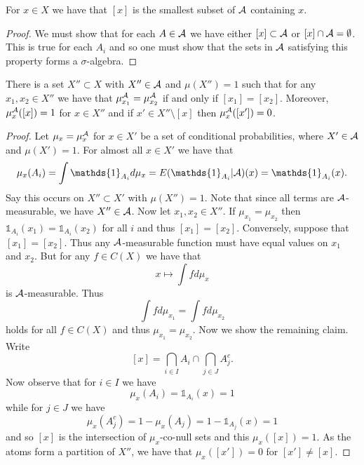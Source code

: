 \documentclass[twoside, a4paper, 10pt]{amsart}
\begin{document}
\begin{prop} For $x \in X$ we have that $[x]$ is the smallest subset of $\mathcal{A}$ containing $x$.

\end{prop}

\begin{proof} \label{prop: construct atom}  We must show that for each $A \in \mathcal{A}$ we have either $[x] \subset \mathcal{A}$ or $[x] \cap \mathcal{A} = \emptyset$. This is true for each $A_i$ and so one must show that the sets in $\mathcal{A}$ satisfying this property forms a $\sigma$-algebra. \end{proof}

\begin{prop} \label{prop: cond prob supported on atom} There is a set $X'' \subset X$ with $X'' \in \mathcal{A}$ and $\mu(X'')=1$ such that for any $x_1,x_2 \in X''$ we have that $\mu_{x_1}^{\mathcal{A}} = \mu_{x_2}^{\mathcal{A}}$ if and only if $[x_1] = [x_2]$. Moreover, $\mu_x^{\mathcal{A}}([x]) = 1$ for $x \in X''$ and if $x' \in X'' \setminus [x]$ then $\mu_x^{\mathcal{A}}([x']) = 0$.

\end{prop}

\begin{proof} Let $\mu_x = \mu_x^{\mathcal{A}}$ for $x \in X'$ be a set of conditional probabilities, where $X' \in \mathcal{A}$ and $\mu(X')=1$. For almost all $x \in X'$ we have that $$\mu_x(A_i) = \int \mathds{1}_{A_i} d\mu_x = E(\mathds{1}_{A_i}|\cA)(x) = \mathds{1}_{A_i}(x).$$ Say this occurs on $X'' \subset X'$ with $\mu(X'')=1$. Note that since all terms are $\mathcal{A}$-measurable, we have $X'' \in \mathcal{A}$. Now let $x_1,x_2 \in X''$. If $\mu_{x_1} = \mu_{x_2}$ then $\mathds{1}_{A_i}(x_1) = \mathds{1}_{A_i}(x_2)$ for all $i$ and thus $[x_1] = [x_2]$. Conversely, suppose that $[x_1]=[x_2]$. Thus any $\mathcal{A}$-measurable function must have equal values on $x_1$ and $x_2$. But for any $f \in C(X)$ we have that $$x \mapsto \int f d\mu_x$$ is $\mathcal{A}$-measurable. Thus $$\int f d\mu_{x_1} = \int f d \mu_{x_2}$$ holds for all $f \in C(X)$ and thus $\mu_{x_1} = \mu_{x_2}$.
Now we show the remaining claim. Write $$ [x] = \bigcap_{i \in I} A_i \cap \bigcap_{j \in J} A_j^c.$$ Now observe that for $i \in I$ we have $$\mu_x(A_i) = \mathds{1}_{A_i}(x) = 1$$ while for $j \in J$ we have $$\mu_x(A_j^{c}) = 1 - \mu_x(A_j) = 1 - \mathds{1}_{A_j}(x) = 1$$ and so $[x]$ is the intersection of $\mu_x$-co-null sets and this $\mu_x([x]) = 1$. As the atoms form a partition of $X''$, we have that $\mu_x([x'])=0$ for $[x'] \neq [x]$. \end{proof}
\end{document}
